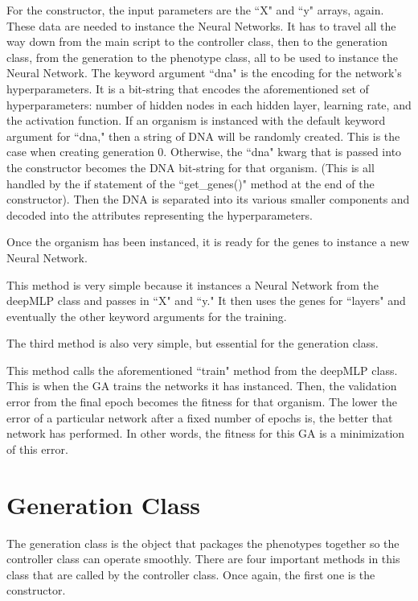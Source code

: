\documentclass[12pt]{report}
\begin{document}
For the constructor, the input parameters are the ``X" and ``y" arrays, again.
These data are needed to instance the Neural Networks.
It has to travel all the way down from the main script to the controller class, then to the generation class, from the generation to the phenotype class, all to be used to instance the Neural Network.
The keyword argument ``dna" is the encoding for the network's hyperparameters.
It is a bit-string that encodes the aforementioned set of hyperparameters: number of hidden nodes in each hidden layer, learning rate, and the activation function.
If an organism is instanced with the default keyword argument for ``dna," then a string of DNA will be randomly created.
This is the case when creating generation 0.
Otherwise, the ``dna" kwarg that is passed into the constructor becomes the DNA bit-string for that organism.
(This is all handled by the if statement of the ``get\_genes()" method at the end of the constructor).
Then the DNA is separated into its various smaller components and decoded into the attributes representing the hyperparameters.

Once the organism has been instanced, it is ready for the genes to instance a new Neural Network.



This method is very simple because it instances a Neural Network from the deepMLP class and passes in ``X" and ``y." It then uses the genes for ``layers" and eventually the other keyword arguments for the training.

The third method is also very simple, but essential for the generation class.



This method calls the aforementioned ``train" method from the deepMLP class. This is when the GA trains the networks it has instanced. Then, the validation error from the final epoch becomes the fitness for that organism. The lower the error of a particular network after a fixed number of epochs is, the better that network has performed. In other words, the fitness for this GA is a minimization of this error.

\section{Generation Class}
The generation class is the object that packages the phenotypes together so the controller class can operate smoothly.
There are four important methods in this class that are called by the controller class. Once again, the first one is the constructor.
\end{document}

